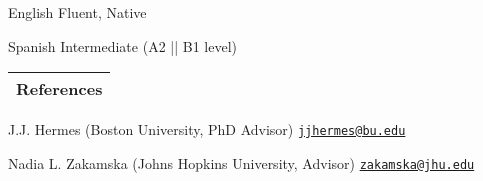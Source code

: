 \documentclass[letterpaper,11pt]{article}
\newenvironment{packed_itemize}{
\begin{itemize}[label=\raisebox{0.25ex}{\tiny$\bullet$}]
  \setlength{\itemsep}{4.2pt}
  \setlength{\parskip}{0pt}
  \setlength{\parsep}{0pt}}{\end{itemize}
}
\begin{document}
\begin{packed_itemize}
    \item English \hfill Fluent, Native
    \item Spanish \hfill Intermediate (A2 || B1 level)
\end{packed_itemize}



\noindent
\begin{tabular*}{\textwidth}{l@{\extracolsep{\fill}}}
\large {\sc \Large{References}}\\
\hline
\end{tabular*}\vspace{1.mm}

\begin{packed_itemize}
    \item J.J. Hermes (Boston University, PhD Advisor) \hfill \href{mailto:jjhermes@bu.edu}{\texttt{jjhermes@bu.edu}}
    \item Nadia L. Zakamska (Johns Hopkins University, Advisor) \hfill \href{mailto:zakamska@jhu.edu}{\texttt{zakamska@jhu.edu}}
\end{packed_itemize}


\vspace*{\fill}
\end{document}
